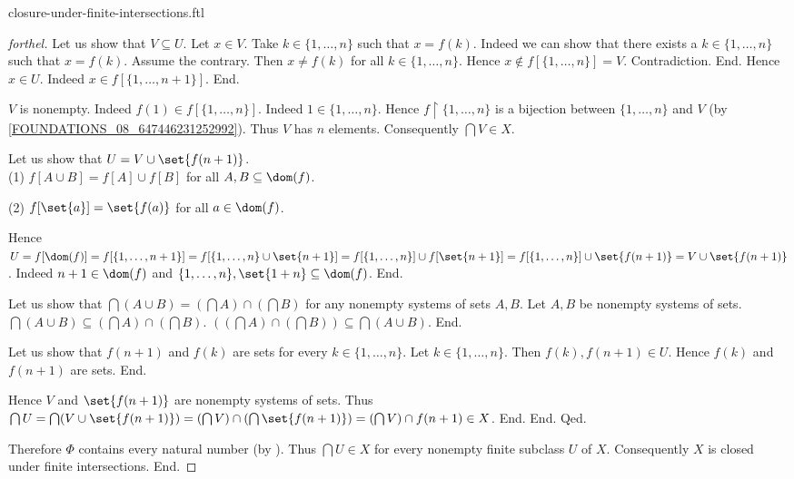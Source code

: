 \documentclass{naproche-library}
\begin{document}
\begin{smodule}{closure-under-finite-intersections.ftl}
\begin{proof}[forthel]
            Let us show that $V \subseteq U$.
              Let $x \in V$.
              Take $k \in \{ 1, \dots, n \}$ such that $x = f(k)$.
              Indeed we can show that there exists a $k \in \{ 1, \dots, n \}$ such that $x = f(k)$.
                Assume the contrary.
                Then $x \neq f(k)$ for all $k \in \{ 1, \dots, n \}$.
                Hence $x \notin f[\{ 1, \dots, n \}] = V$.
                Contradiction.
              End.
              Hence $x \in U$.
              Indeed $x \in f[\{ 1, \dots, n + 1 \}]$.
            End.

            $V$ is nonempty.
            Indeed $f(1) \in f[\{ 1, \dots, n \}]$.
            Indeed $1 \in \{ 1, \dots, n \}$.
            Hence $f \restriction \{ 1, \dots, n \}$ is a bijection between $\{ 1, \dots, n \}$ and $V$ (by \cref{FOUNDATIONS_08_647446231252992}).
            Thus $V$ has $n$ elements.
            Consequently $\bigcap V \in X$.

            Let us show that $U = V \cup \set{f(n + 1)}$. \\
              (1) $f[A \cup B] = f[A] \cup f[B]$ for all $A, B \subseteq \dom(f)$.

              (2) $f[\set{a}] = \set{f(a)}$ for all $a \in \dom(f)$.

              Hence $U
                = f[\dom(f)]
                = f[\{ 1, \dots, n + 1 \}]
                = f[\{ 1, \dots, n \} \cup \set{n + 1}]
                = f[\{ 1, \dots, n \}] \cup f[\set{n + 1}]
                = f[\{ 1, \dots, n \}] \cup \set{f(n + 1)}
                = V \cup \set{f(n + 1)}$.
              Indeed $n + 1 \in \dom(f)$ and $\{ 1, \dots, n \}, \set{1 + n} \subseteq \dom(f)$.
            End.

            Let us show that $\bigcap (A \cup B) = (\bigcap A) \cap (\bigcap B)$ for any nonempty systems of sets $A, B$.
              Let $A, B$ be nonempty systems of sets.
              $\bigcap (A \cup B) \subseteq (\bigcap A) \cap (\bigcap B)$.
              $((\bigcap A) \cap (\bigcap B)) \subseteq \bigcap (A \cup B)$. %
            End.

            Let us show that $f(n + 1)$ and $f(k)$ are sets for every $k \in \{ 1, \dots, n \}$.
              Let $k \in \{ 1, \dots, n \}$.
              Then $f(k), f(n + 1) \in U$.
              Hence $f(k)$ and $f(n + 1)$ are sets.
            End.

            Hence $V$ and $\set{f(n + 1)}$ are nonempty systems of sets.
            Thus $\bigcap U
              = \bigcap (V \cup \set{f(n + 1)})
              = (\bigcap V) \cap (\bigcap \set{f(n + 1)})
              = (\bigcap V) \cap f(n + 1)
              \in X$.
          End.
        End.
      Qed.

      Therefore $\Phi$ contains every natural number (by ).
      Thus $\bigcap U \in X$ for every nonempty finite subclass $U$ of $X$.
      Consequently $X$ is closed under finite intersections.
    End.
  \end{proof}
\end{smodule}
\end{document}
